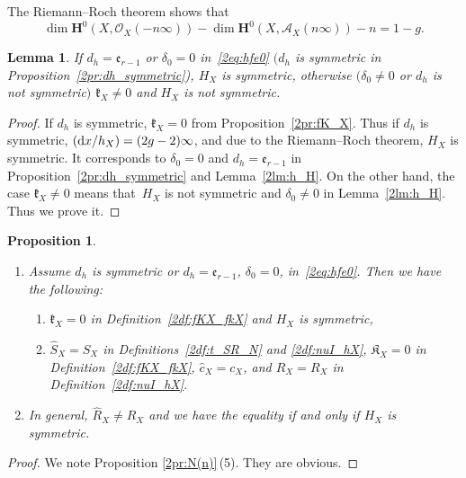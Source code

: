 \documentclass[10pt,a4paper]{amsart}
\def\bH{{\mathbf F}}
\def\bH{{\mathbf H}}
\def\cA{{\mathcal A}}
\def\cO{{\mathcal O}}
\def\fK{{\mathfrak K}}
\def\fe{{\mathfrak e}}
\def\fk{{\mathfrak k}}
\def\hc{{\widehat c}}
\def\hR{{\widehat R}}
\def\hS{{\widehat S}}
\numberwithin{equation}{section}
\newtheorem{Lemma}[Theorem]{Lemma}
\newtheorem{Proposition}[Theorem]{Proposition}
 { \theoremstyle{definition}
\newtheorem{Definition}[Theorem]{Definition}
\newtheorem{Note}[Theorem]{Note}
\newtheorem{Example}[Theorem]{Example}
\newtheorem{Remark}[Theorem]{Remark} }
\begin{document}
The Riemann--Roch theorem shows that
\begin{equation*}
\dim \bH^0(X, \cO_X(-n\infty))-\dim \bH^0(X, \cA_X(n\infty))-n=1-g.%
\end{equation*}

\begin{Lemma}\label{2lm:nuIo1}
If $d_h=\fe_{r-1}$ or $\delta_0 = 0$ in~\eqref{2eq:hfe0} $(d_h$ is symmetric in Proposition~{\rm \ref{2pr:dh_symmetric})}, $H_X$ is symmetric, otherwise $(\delta_0 \neq 0$ or $d_h$ is not symmetric$)$ $\fk_X\neq 0$ and $H_X$ is not symmetric.
\end{Lemma}

\begin{proof}If $d_h$ is symmetric, $\fk_X=0$ from Proposition~\ref{2pr:fK_X}.
Thus if $d_h$ is symmetric, $({\rm d} x/h_X)=(2g-2)\infty$, and due to the Riemann--Roch theorem, $H_X$ is symmetric.
It corresponds to $\delta_0 = 0$ and $d_h = \fe_{r-1}$ in Proposition~\ref{2pr:dh_symmetric} and Lemma~\ref{2lm:h_H}.
On the other hand, the case $\fk_X\neq 0$ means that~$H_X$ is not symmetric and $\delta_0 \neq 0$ in Lemma~\ref{2lm:h_H}. Thus we prove it.
\end{proof}

\begin{Proposition}\label{2pr:dh_HXsymmetric}\quad
\begin{enumerate}\itemsep=0pt
\item[$1.$] Assume $d_h$ is symmetric or $d_h = \fe_{r-1}$, $\delta_0 = 0$, in~\eqref{2eq:hfe0}.
Then we have the following:
\begin{enumerate}\itemsep=0pt
\item[$(a)$] $\fk_X=0$ in Definition~{\rm \ref{2df:fKX_fkX}} and $H_X$ is symmetric,

\item[$(b)$] $\hS_X = S_X$ in Definitions~{\rm \ref{2df:t_SR_N}} and {\rm \ref{2df:nuI_hX}}, $\fK_X=0$ in Definition~{\rm \ref{2df:fKX_fkX}}, $\hc_X=c_X$, and $\hR_X = R_X$ in Definition~{\rm \ref{2df:nuI_hX}}.
\end{enumerate}
\item[$2.$] In general, $\hR_X \neq R_X$ and we have the equality if and only if $H_X$ is symmetric.
\end{enumerate}
\end{Proposition}

\begin{proof}We note Proposition \ref{2pr:N(n)}\,(5). They are obvious.
\end{proof}
\end{document}
